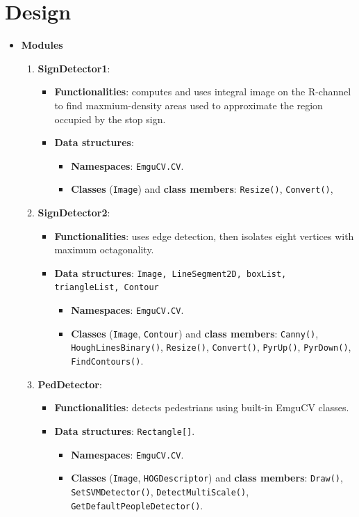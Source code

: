 \documentclass{article}
\begin{document}
\section{Design}
\begin{itemize}
 \item \textbf{Modules}
 \begin{enumerate} 
  \item \textbf{SignDetector1}:
   \begin{itemize} 
    \item \textbf{Functionalities}: computes and uses integral image on the R-channel
          to find maxmium-density areas used to approximate the region occupied
          by the stop sign. 
    \item \textbf{Data structures}: 
     \begin{itemize}
      \item \textbf{Namespaces}: \texttt{EmguCV.CV}.
      \item \textbf{Classes} (\texttt{Image}) and \textbf{class members}:
        \texttt{Resize()},       \texttt{Convert()},
     \end{itemize}
   \end{itemize} 
  \item \textbf{SignDetector2}:
   \begin{itemize} 
    \item \textbf{Functionalities}: uses edge detection, then isolates eight vertices
          with maximum octagonality.
    \item \textbf{Data structures}: 
          \texttt{Image, LineSegment2D, boxList, triangleList, Contour}
     \begin{itemize}
      \item \textbf{Namespaces}: \texttt{EmguCV.CV}.
      \item \textbf{Classes} (\texttt{Image}, \texttt{Contour}) and \textbf{class members}:
        \texttt{Canny()},        \texttt{HoughLinesBinary()},
        \texttt{Resize()},       \texttt{Convert()},
        \texttt{PyrUp()},        \texttt{PyrDown()},
        \texttt{FindContours()}.
     \end{itemize}
   \end{itemize} 

  \item \textbf{PedDetector}:
   \begin{itemize} 
    \item \textbf{Functionalities}: detects pedestrians using built-in EmguCV classes.
    \item \textbf{Data structures}: \texttt{Rectangle[]}.
     \begin{itemize}
      \item \textbf{Namespaces}: \texttt{EmguCV.CV}.
      \item \textbf{Classes} (\texttt{Image}, \texttt{HOGDescriptor}) and \textbf{class members}: 
       \texttt{Draw()},
       \texttt{SetSVMDetector()},
       \texttt{DetectMultiScale()},
       \texttt{GetDefaultPeopleDetector()}.
     \end{itemize}
   \end{itemize} 


\end{enumerate}
\end{itemize}
\end{document}
